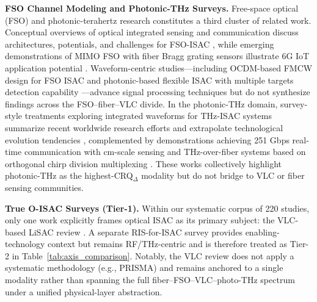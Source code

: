 \documentclass[lettersize,journal]{IEEEtran}
\begin{document}
\textbf{FSO Channel Modeling and Photonic-THz Surveys.} Free-space optical (FSO) and photonic-terahertz research constitutes a third cluster of related work. Conceptual overviews of optical integrated sensing and communication discuss architectures, potentials, and challenges for FSO-ISAC \cite{O_ISAC_021}, while emerging demonstrations of MIMO FSO with fiber Bragg grating sensors illustrate 6G IoT application potential \cite{O_ISAC_199}. Waveform-centric studies---including OCDM-based FMCW design for FSO ISAC \cite{O_ISAC_035} and photonic-based flexible ISAC with multiple targets detection capability \cite{O_ISAC_058}---advance signal processing techniques but do not synthesize findings across the FSO--fiber--VLC divide. In the photonic-THz domain, survey-style treatments exploring integrated waveforms for THz-ISAC systems summarize recent worldwide research efforts and extrapolate technological evolution tendencies \cite{O_ISAC_070}, complemented by demonstrations achieving 251 Gbps real-time communication with cm-scale sensing \cite{O_ISAC_016} and THz-over-fiber systems based on orthogonal chirp division multiplexing \cite{O_ISAC_077}. These works collectively highlight photonic-THz as the highest-CRQ$_{\Delta}$ modality but do not bridge to VLC or fiber sensing communities.

\textbf{True O-ISAC Surveys (Tier-1).} Within our systematic corpus of 220 studies, only one work explicitly frames optical ISAC as its primary subject: the VLC-based LiSAC review \cite{O_ISAC_303}. A separate RIS-for-ISAC survey \cite{O_ISAC_163} provides enabling-technology context but remains RF/THz-centric and is therefore treated as Tier-2 in Table~\ref{tab:axis_comparison}. Notably, the VLC review does not apply a systematic methodology (e.g., PRISMA) and remains anchored to a single modality rather than spanning the full fiber--FSO--VLC--photo-THz spectrum under a unified physical-layer abstraction.
\end{document}
